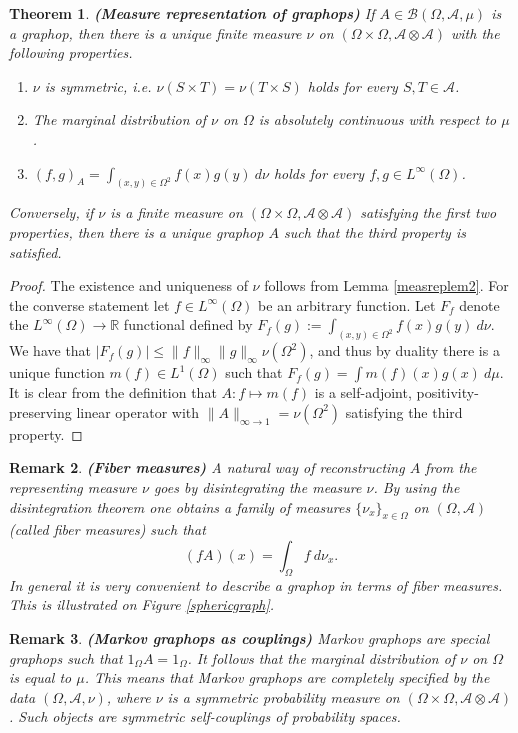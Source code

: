 \documentclass[a4wider]{amsart}
\newtheorem{theorem}{Theorem}[section]
\newtheorem{remarka}[theorem]{Remark}
\theoremstyle{definitionbreak}\newtheorem{D}[theorem]{Definition}
\theoremstyle{definitionbreak}\newtheorem*{D*}{Definition}
\begin{document}
\begin{theorem}\label{measrepthm} {\bf (Measure representation of graphops)} If $A\in\mathcal{B}(\Omega,\mathcal{A},\mu)$ is a graphop, then there is a unique finite measure $\nu$ on $(\Omega\times\Omega,\mathcal{A}\otimes\mathcal{A})$ with the following properties.
\begin{enumerate} 
\item $\nu$ is symmetric, i.e. $\nu(S\times T)=\nu(T\times S)$ holds for every $S,T\in\mathcal{A}$.
\item The marginal distribution of $\nu$ on $\Omega$ is absolutely continuous with respect to $\mu$. 
\item 
$(f,g)_A=\int_{(x,y)\in\Omega^2}f(x)g(y)~d\nu$ holds for every $f,g\in L^\infty(\Omega)$. 
\end{enumerate}
Conversely, if $\nu$ is a finite measure on $(\Omega\times\Omega,\mathcal{A}\otimes\mathcal{A})$ satisfying the first two properties, then there is a unique graphop $A$ such that the third property is satisfied. 
\end{theorem}

\begin{proof} The existence and uniqueness of $\nu$ follows from Lemma \ref{measreplem2}. For the converse statement let $f\in L^\infty(\Omega)$ be an arbitrary function. Let $F_f$ denote the   $L^\infty(\Omega)\to\mathbb{R}$ functional defined by $F_f(g):=\int_{(x,y)\in\Omega^2}f(x)g(y)~d\nu$. We have that $|F_f(g)|\leq \|f\|_\infty\|g\|_\infty\nu(\Omega^2)$, and thus by duality there is a unique function $m(f)\in L^1(\Omega)$ such that $F_f(g)=\int m(f)(x)g(x)~d\mu$. It is clear from the definition that $A:f\mapsto m(f)$ is a self-adjoint, positivity-preserving linear operator with $\|A\|_{\infty\to 1}=\nu(\Omega^2)$ satisfying the third property.
\end{proof}

\begin{remarka} {\bf (Fiber measures)} A natural way of reconstructing $A$ from the representing measure $\nu$ goes by disintegrating the measure $\nu$. By using the disintegration theorem one obtains a family of measures $\{\nu_x\}_{x\in\Omega}$ on $(\Omega,\mathcal{A})$ (called fiber measures) such that $$(fA)(x)=\int_\Omega f~d\nu_x.$$ In general it is very convenient to describe a graphop in terms of fiber measures. This is illustrated on Figure \ref{sphericgraph}.
\end{remarka}

\begin{remarka} {\bf (Markov graphops as couplings)} Markov graphops are special graphops such that $1_\Omega A=1_\Omega$. It follows that the marginal distribution of $\nu$ on $\Omega$ is equal to $\mu$. This means that Markov graphops are completely specified by the data $(\Omega,\mathcal{A},\nu)$, where $\nu$ is a symmetric probability measure on $(\Omega\times\Omega,\mathcal{A}\otimes\mathcal{A})$. Such objects are symmetric self-couplings of probability spaces.
\end{remarka}
\end{document}
